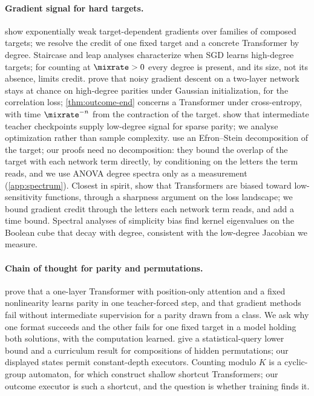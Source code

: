 \paragraph{Gradient signal for hard targets.} \citet{shalevshwartz2017failures} show exponentially weak target-dependent
gradients over families of composed targets; we resolve the credit of one fixed target and a concrete Transformer by
degree. Staircase and leap analyses \citep{abbe2021staircase,abbe2022mergedstaircase,abbe2023sgd} characterize when SGD
learns high-degree targets; for counting at $\mixrate>0$ every degree is present, and its size, not its absence, limits
credit. \citet{abbe2025parities} prove that noisy gradient descent on a two-layer network stays at chance on high-degree
parities under Gaussian initialization, for the correlation loss; \cref{thm:outcome-end} concerns a Transformer under
cross-entropy, with time $\mixrate^{-n}$ from the contraction of the target. \citet{panigrahi2025progressive} show that
intermediate teacher checkpoints supply low-degree signal for sparse parity; we analyse optimization rather than sample
complexity. \citet{li2025noise} use an Efron--Stein decomposition of the target; our proofs need no decomposition: they bound the
overlap of the target with each network term directly, by conditioning on the letters the term reads, and we use ANOVA degree spectra
only as a measurement (\cref{app:spectrum}). Closest in spirit,
\citet{hahn2024sensitive} show that Transformers are biased toward low-sensitivity functions, through a sharpness argument on
the loss landscape; we bound gradient credit through the letters each network term reads, and add a time bound. Spectral analyses of simplicity bias \citep{yang2019spectral} find kernel eigenvalues on the Boolean cube that
decay with degree, consistent with the low-degree Jacobian we measure.

\paragraph{Chain of thought for parity and permutations.} \citet{kim2024parity} prove that a one-layer Transformer with
position-only attention and a fixed nonlinearity learns parity in one teacher-forced step, and that gradient methods fail
without intermediate supervision for a parity drawn from a class. We ask why one format succeeds and the other fails for
one fixed target in a model holding both solutions, with the computation learned. \citet{wang2025compositional} give a
statistical-query lower bound and a curriculum result for compositions of hidden permutations; our displayed states
permit constant-depth executors. Counting modulo $K$ is a cyclic-group automaton, for which \citet{liu2023automata} construct
shallow shortcut Transformers; our outcome executor is such a shortcut, and the question is whether training finds it.

